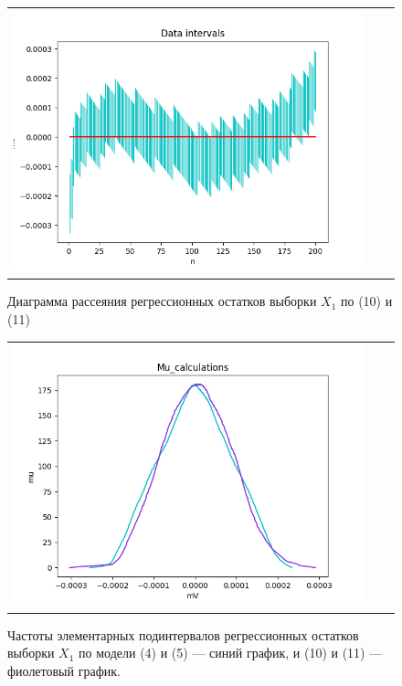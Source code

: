 \documentclass[a4paper,14pt]{article}
\begin{document}
	\begin{figure}[H]
		\begin{center}
			\begin{tabular}{ccc}
				\includegraphics[scale=0.8]{../image/regression_2.png}
			\end{tabular}
		\end{center}
		\caption{Диаграмма рассеяния регрессионных остатков выборки $X_1$ по (10) и (11)} 
	\end{figure}
	\begin{figure}[H]
		\begin{center}
			\begin{tabular}{ccc}
				\includegraphics[scale=0.8]{../image/input_mu.png}
			\end{tabular}
		\end{center}
		\caption{Частоты элементарных подинтервалов регрессионных остатков выборки $X_1$ по модели (4) и (5) — синий график, и (10) и (11) — фиолетовый график.} 
	\end{figure}
\end{document}
